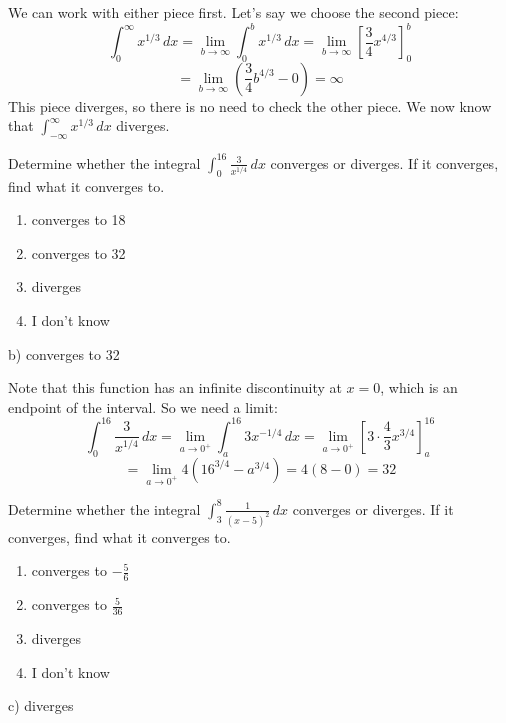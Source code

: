 \documentclass[addpoints,12pt,answers]{exam}
\begin{document}
\begin{questions}
\begin{solution}
    We can work with either piece first. Let's say we choose the second piece:
    $$\int_0^\infty x^{1/3}\,dx=\lim_{b\to\infty}\int_0^b x^{1/3}\,dx=\lim_{b\to\infty}\left[\frac{3}{4}x^{4/3}\right]_0^b$$
    $$=\lim_{b\to\infty}\left(\frac{3}{4}b^{4/3}-0\right)=\infty$$
    This piece diverges, so there is no need to check the other piece. We now know that $\displaystyle\int_{-\infty}^\infty x^{1/3}\,dx$ diverges.
  \end{solution}
  \newpage
  \question
  Determine whether the integral $\displaystyle\int_0^{16}\frac{3}{x^{1/4}}\,dx$ converges or diverges. If it converges, find what it converges to.
  \begin{enumerate}[label=\alph*)]
    \item
    converges to 18
    \item
    converges to 32
    \item
    diverges
    \item
    I don't know
  \end{enumerate}
  \begin{solution}
    b) converges to 32
    
    Note that this function has an infinite discontinuity at $x=0$, which is an endpoint of the interval. So we need a limit:
    $$\int_0^{16}\frac{3}{x^{1/4}}\,dx=\lim_{a\to 0^+}\int_a^{16} 3x^{-1/4}\,dx=\lim_{a\to 0^+}\left[3\cdot\frac{4}{3}x^{3/4}\right]_a^{16}$$
    $$=\lim_{a\to 0^+}4\left(16^{3/4}-a^{3/4}\right)=4(8-0)=32$$
  \end{solution}
  \newpage
  \question
  Determine whether the integral $\displaystyle\int_3^8\frac{1}{(x-5)^2}\,dx$ converges or diverges. If it converges, find what it converges to.
  \begin{enumerate}[label=\alph*)]
    \item
    converges to $\displaystyle -\frac{5}{6}$
    \item
    converges to $\displaystyle\frac{5}{36}$
    \item
    diverges
    \item
    I don't know
  \end{enumerate}
  \begin{solution}
    c) diverges
    

\end{solution}
\end{questions}
\end{document}
